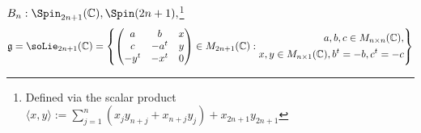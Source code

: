 \documentclass[reqno]{amsart} 
\begin{document}
$B_{n}: \Spin_{2n+1}(\mathbb{C}), \Spin(2n+1),$\footnote{ Defined via the scalar product $\langle x,y \rangle := \sum_{j=1}^n (x_j y_{n+j} + x_{n+j} y_j) + x_{2 n+1} y_{2n+1}$ }
\begin{equation*}
  \mathfrak{g} = \soLie_{2n+1}(\mathbb{C}) = \left\{ 
\begin{pmatrix}
    a & b  & x \\
    c & -a^t & y \\
    -y^t & - x^t & 0
  \end{pmatrix}
 \in M_{2n+1}(\mathbb{C}) :
  \begin{split}
    a,b,c \in M_{n \times n}(\mathbb{C}),
    \\
    x,y \in M_{n \times 1}(\mathbb{C}),
    b^t = -b, c^t = -c
  \end{split}
\right\}
\end{equation*}
\end{document}
